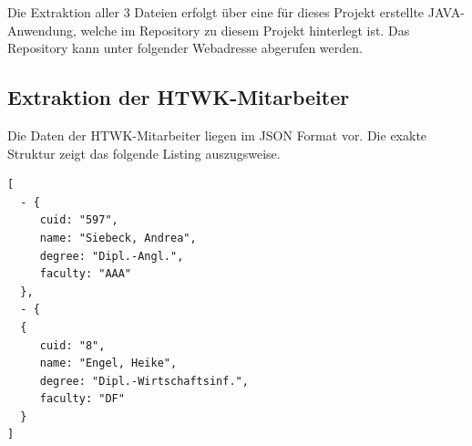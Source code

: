 \documentclass[parskip]{scrartcl}
\begin{document}
Die Extraktion aller 3 Dateien erfolgt über eine für dieses Projekt erstellte JAVA-Anwendung, welche im Repository zu diesem Projekt hinterlegt ist. Das Repository kann unter folgender Webadresse abgerufen werden\cite{gitmkirbstsm}.

\subsection{Extraktion der HTWK-Mitarbeiter}
Die Daten der HTWK-Mitarbeiter liegen im JSON Format vor. Die exakte Struktur zeigt das folgende Listing auszugsweise. 

\begin{lstlisting}[captionpos=b, caption=Format der importierten HTWK-Mitarbeiterdaten, label=Format der importierten HTWK-Mitarbeiterdaten]
[
  - {
     cuid: "597",
     name: "Siebeck, Andrea",
     degree: "Dipl.-Angl.",
     faculty: "AAA"
  },
  - {
  {
     cuid: "8",
     name: "Engel, Heike",
     degree: "Dipl.-Wirtschaftsinf.",
     faculty: "DF"
  }
]
\end{lstlisting}
\end{document}
